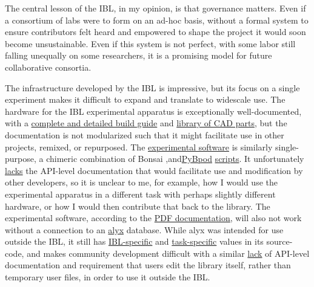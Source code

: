\documentclass{article}
\begin{document}
The central lesson of the IBL, in my opinion, is that governance
matters. Even if a consortium of labs were to form on an ad-hoc basis,
without a formal system to ensure contributors felt heard and empowered
to shape the project it would soon become unsustainable. Even if this
system is not perfect, with some labor still falling unequally on some
researchers, it is a promising model for future collaborative consortia.

The infrastructure developed by the IBL is impressive, but its focus on
a single experiment makes it difficult to expand and translate to
widescale use. The hardware for the IBL experimental apparatus is
exceptionally well-documented, with a
\href{https://figshare.com/articles/preprint/A_standardized_and_reproducible_method_to_measure_decision-making_in_mice_Appendix_3_IBL_protocol_for_setting_up_the_behavioral_training_rig/11634732}{complete
and detailed build guide} and
\href{https://figshare.com/articles/online_resource/A_standardized_and_reproducible_method_to_measure_decision-making_in_mice_CAD_files_for_behavior_rig/11639973}{library
of CAD parts}, but the documentation is not modularized such that it
might facilitate use in other projects, remixed, or repurposed. The
\href{https://github.com/int-brain-lab/iblrig}{experimental software} is
similarly single-purpose, a chimeric combination of Bonsai \cite{lopesBonsaiEventbasedFramework2015},and\href{https://github.com/pybpod/pybpod}{PyBpod}
\href{https://github.com/int-brain-lab/iblrig/tree/master/tasks/_iblrig_tasks_ephysChoiceWorld}{scripts}.
It unfortunately
\href{https://iblrig.readthedocs.io/en/latest/index.html}{lacks} the
API-level documentation that would facilitate use and modification by
other developers, so it is unclear to me, for example, how I would use
the experimental apparatus in a different task with perhaps slightly
different hardware, or how I would then contribute that back to the
library. The experimental software, according to the
\href{https://figshare.com/articles/preprint/A_standardized_and_reproducible_method_to_measure_decision-making_in_mice_Appendix_3_IBL_protocol_for_setting_up_the_behavioral_training_rig/11634732}{PDF
documentation}, will also not work without a connection to an
\href{https://github.com/cortex-lab/alyx}{alyx} database. While alyx was
intended for use outside the IBL, it still has
\href{https://github.com/cortex-lab/alyx/blob/07f481f6bbde668b81ad2634f4c42df4d6a74e44/alyx/data/management/commands/files.py\#L188}{IBL-specific}
and
\href{https://github.com/cortex-lab/alyx/blob/07f481f6bbde668b81ad2634f4c42df4d6a74e44/alyx/data/fixtures/data.datasettype.json\#L29}{task-specific}
values in its source-code, and makes community development difficult
with a similar \href{https://alyx.readthedocs.io/en/latest/}{lack} of
API-level documentation and requirement that users edit the library
itself, rather than temporary user files, in order to use it outside the
IBL.
\end{document}
